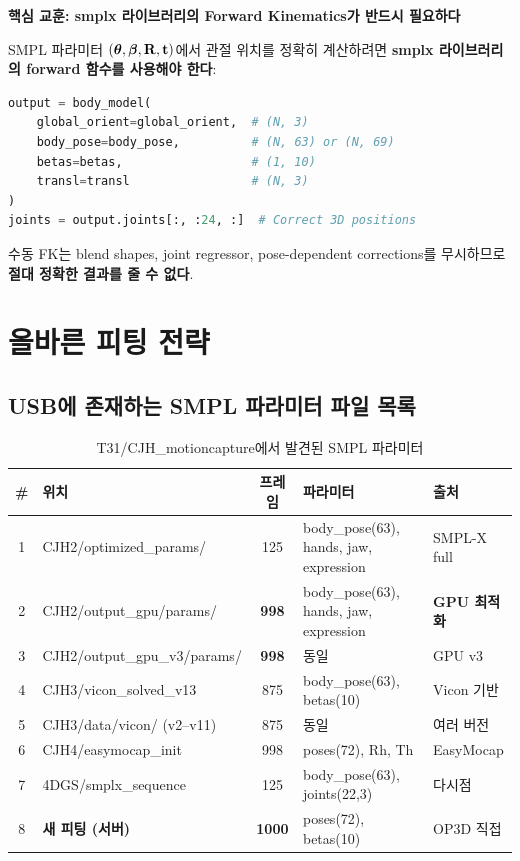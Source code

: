 \documentclass[11pt, a4paper]{report}
\begin{document}
\begin{lessonbox}
\textbf{핵심 교훈: smplx 라이브러리의 Forward Kinematics가 반드시 필요하다}

SMPL 파라미터 $(\bm{\theta}, \bm{\beta}, \mathbf{R}, \mathbf{t})$에서 관절 위치를 정확히 계산하려면
\textbf{smplx 라이브러리의 forward 함수를 사용해야 한다}:

\begin{lstlisting}[language=Python, numbers=none]
output = body_model(
    global_orient=global_orient,  # (N, 3)
    body_pose=body_pose,          # (N, 63) or (N, 69)
    betas=betas,                  # (1, 10)
    transl=transl                 # (N, 3)
)
joints = output.joints[:, :24, :]  # Correct 3D positions
\end{lstlisting}

수동 FK는 blend shapes, joint regressor, pose-dependent corrections를 무시하므로
\textbf{절대 정확한 결과를 줄 수 없다}.
\end{lessonbox}


\chapter{올바른 피팅 전략}

\section{USB에 존재하는 SMPL 파라미터 파일 목록}

\begin{table}[H]
\centering
\caption{T31/CJH\_motioncapture에서 발견된 SMPL 파라미터}
\renewcommand{\arraystretch}{1.3}
\small
\begin{tabularx}{\textwidth}{clcXl}
\toprule
\textbf{\#} & \textbf{위치} & \textbf{프레임} & \textbf{파라미터} & \textbf{출처} \\
\midrule
1 & CJH2/optimized\_params/ & 125 & body\_pose(63), hands, jaw, expression & SMPL-X full \\
2 & CJH2/output\_gpu/params/ & \textbf{998} & body\_pose(63), hands, jaw, expression & \textbf{GPU 최적화} \\
3 & CJH2/output\_gpu\_v3/params/ & \textbf{998} & 동일 & GPU v3 \\
4 & CJH3/vicon\_solved\_v13 & 875 & body\_pose(63), betas(10) & Vicon 기반 \\
5 & CJH3/data/vicon/ (v2--v11) & 875 & 동일 & 여러 버전 \\
6 & CJH4/easymocap\_init & 998 & poses(72), Rh, Th & EasyMocap \\
7 & 4DGS/smplx\_sequence & 125 & body\_pose(63), joints(22,3) & 다시점 \\
8 & \textbf{새 피팅 (서버)} & \textbf{1000} & poses(72), betas(10) & OP3D 직접 \\
\bottomrule
\end{tabularx}
\end{table}
\end{document}
